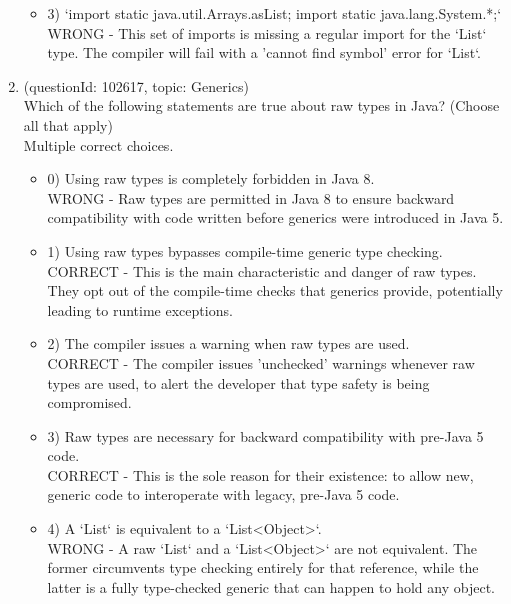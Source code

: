 \documentclass[12pt]{article}
\begin{document}
\begin{enumerate}[label=(\arabic*)]
\begin{itemize}
\item 3) `import static java.util.Arrays.asList;
import static java.lang.System.*;`
 \\ 
WRONG - This set of imports is missing a regular import for the `List` type. The compiler will fail with a 'cannot find symbol' error for `List`.

\end{itemize}
\item (questionId: 102617, topic: Generics) \\ 
Which of the following statements are true about raw types in Java? (Choose all that apply)
\\ \noindent Multiple correct choices. 
\begin{itemize}
\item 0) Using raw types is completely forbidden in Java 8.
 \\ 
WRONG - Raw types are permitted in Java 8 to ensure backward compatibility with code written before generics were introduced in Java 5.

\item 1) Using raw types bypasses compile-time generic type checking.
 \\ 
CORRECT - This is the main characteristic and danger of raw types. They opt out of the compile-time checks that generics provide, potentially leading to runtime exceptions.

\item 2) The compiler issues a warning when raw types are used.
 \\ 
CORRECT - The compiler issues 'unchecked' warnings whenever raw types are used, to alert the developer that type safety is being compromised.

\item 3) Raw types are necessary for backward compatibility with pre-Java 5 code.
 \\ 
CORRECT - This is the sole reason for their existence: to allow new, generic code to interoperate with legacy, pre-Java 5 code.

\item 4) A `List` is equivalent to a `List<Object>`.
 \\ 
WRONG - A raw `List` and a `List<Object>` are not equivalent. The former circumvents type checking entirely for that reference, while the latter is a fully type-checked generic that can happen to hold any object.


\end{itemize}
\end{enumerate}
\end{document}
